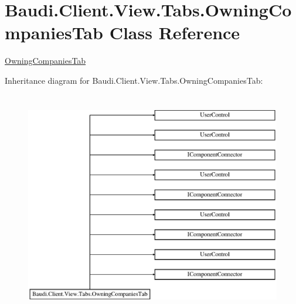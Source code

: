 \hypertarget{class_baudi_1_1_client_1_1_view_1_1_tabs_1_1_owning_companies_tab}{}\section{Baudi.\+Client.\+View.\+Tabs.\+Owning\+Companies\+Tab Class Reference}
\label{class_baudi_1_1_client_1_1_view_1_1_tabs_1_1_owning_companies_tab}


\hyperlink{class_baudi_1_1_client_1_1_view_1_1_tabs_1_1_owning_companies_tab}{Owning\+Companies\+Tab}  


Inheritance diagram for Baudi.\+Client.\+View.\+Tabs.\+Owning\+Companies\+Tab\+:\begin{figure}[H]
\begin{center}
\leavevmode
\includegraphics[height=9.964413cm]{class_baudi_1_1_client_1_1_view_1_1_tabs_1_1_owning_companies_tab}
\end{center}
\end{figure}
